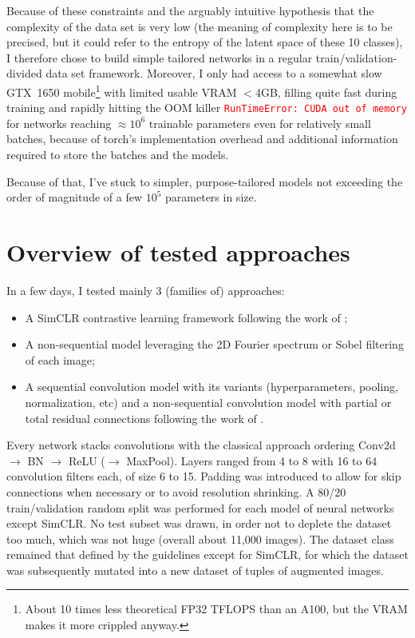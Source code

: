 \documentclass{article}
\newcommand{\codewordred}[1]{\texttt{\textcolor{red}{#1}}}
\begin{document}
Because of these constraints and the arguably intuitive hypothesis that the complexity of the data set is very low (the meaning of complexity here is to be precised, but it could refer to the entropy of the latent space of these 10 classes), I therefore chose to build simple tailored networks in a regular train/validation-divided data set framework. Moreover, I only had access to a somewhat slow GTX~1650 mobile\footnote{About 10 times less theoretical FP32 TFLOPS than an A100, but the VRAM makes it more crippled anyway.}  with limited usable VRAM $<$4GB, filling quite fast during training and rapidly hitting the OOM killer \codewordred{RunTimeError: CUDA out of memory}   for networks reaching $\approx 10^6$ trainable parameters even for relatively small  batches, because of torch's implementation overhead and additional information required to store the batches and the models.

Because of that, I've stuck to simpler, purpose-tailored models not exceeding the  order of magnitude of a few $10^5$  parameters in size. 


\section{Overview of tested approaches}
In a few days, I tested mainly 3 (families of) approaches: 
\begin{itemize}
    \item A SimCLR  contrastive learning framework following the work of \cite{Chen2020-uz};
    \item A non-sequential model leveraging the 2D Fourier spectrum or Sobel filtering of each image;
    \item A sequential convolution  model with its variants (hyperparameters, pooling, normalization, etc) and a  non-sequential convolution model with partial or total residual connections following the work of \cite{He2015-bw}.
\end{itemize}


Every network stacks convolutions with the classical  \cite{Ronneberger2015-ib} approach ordering Conv2d $\rightarrow$ BN $\rightarrow$ ReLU ($\rightarrow$ MaxPool). Layers ranged from 4 to 8 with 16 to 64 convolution filters each, of size 6 to 15. Padding was introduced to allow for skip connections when necessary or to avoid resolution shrinking. A 80/20 train/validation random split was performed for each model of neural networks except SimCLR. No test subset was drawn, in order not to deplete the dataset too much, which was not huge (overall about 11,000 images). The dataset class remained that defined by the guidelines except for SimCLR, for which the dataset  was subsequently mutated into a new dataset of tuples of augmented images.
\end{document}
